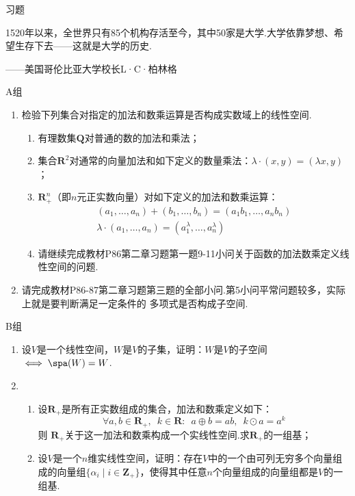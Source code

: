 \centerline{\heiti \Large 习题}
\vspace{2ex}
{\kaishu 1520年以来，全世界只有85个机构存活至今，其中50家是大学.大学依靠梦想、希望生存下去——这就是大学的历史.}
\begin{flushright}
    \kaishu
    ——美国哥伦比亚大学校长L·C·柏林格
\end{flushright}
\centerline{\heiti A组}
\begin{enumerate}
    \item 检验下列集合对指定的加法和数乘运算是否构成实数域上的线性空间.
    \begin{enumerate}[label=(\arabic*)]
        \item 有理数集$\mathbf{Q}$对普通的数的加法和乘法；

        \item 集合$\mathbf{R}^2$对通常的向量加法和如下定义的数量乘法：$\lambda\cdot(x,y)=(\lambda x,y)$；

        \item $\mathbf{R}_+^n$（即$n$元正实数向量）对如下定义的加法和数乘运算：
        \begin{gather*}
            (a_1,\ldots,a_n)+(b_1,\ldots,b_n)=(a_1b_1,\ldots,a_nb_n) \\
            \lambda\cdot(a_1,\ldots,a_n)=(a_1^\lambda,\ldots,a_n^\lambda)
        \end{gather*}

        \item 请继续完成教材P86第二章习题第一题9-11小问关于函数的加法数乘定义线性空间的问题.
    \end{enumerate}
    \item 请完成教材P86-87第二章习题第三题的全部小问.第5小问平常问题较多，实际上就是要判断满足一定条件的
          多项式是否构成子空间.
\end{enumerate}
\centerline{\heiti B组}
\begin{enumerate}
    \item 设$V$是一个线性空间，$W$是$V$的子集，证明：$W$是$V$的子空间$\iff \spa(W)=W$.
    \item \begin{enumerate}[label=(\arabic*)]
        \item 设$\mathbf{R}_+$是所有正实数组成的集合，加法和数乘定义如下：\[ \forall a,b \in \mathbf{R}_+,\enspace k\in \mathbf{R}\colon\enspace a\oplus b = ab,\enspace k\odot a = a^k \] 则 $\mathbf{R}_+$关于这一加法和数乘构成一个实线性空间.求$\mathbf{R}_+$的一组基；

        \item 设$V$是一个$n$维实线性空间，证明：存在$V$中的一个由可列无穷多个向量组成的向量组$\{\alpha_i \mid i\in\mathbf{Z}_+\}$，使得其中任意$n$个向量组成的向量组都是$V$的一组基.
    \end{enumerate}
\end{enumerate}
